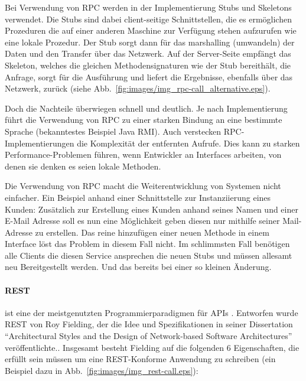 \documentclass[12pt,a4paper,bibliography=totocnumbered,listof=totocnumbered]{scrartcl}
\begin{document}
Bei Verwendung von RPC werden in der Implementierung Stubs und Skeletons verwendet. Die Stubs sind dabei client-seitige Schnittstellen, die es ermöglichen Prozeduren die auf einer anderen Maschine zur Verfügung stehen aufzurufen wie eine lokale Prozedur. Der Stub sorgt dann für das marshalling (umwandeln) der Daten und den Transfer über das Netzwerk. Auf der Server-Seite empfängt das Skeleton, welches die gleichen Methodensignaturen wie der Stub bereithält, die Anfrage, sorgt für die Ausführung und liefert die Ergebnisse, ebenfalls über das Netzwerk, zurück (siehe Abb.~\ref{fig:images/img_rpc-call_alternative.eps}).\cite{krzyzanowski}


Doch die Nachteile überwiegen schnell und deutlich. Je nach Implementierung führt die Verwendung von RPC zu einer starken Bindung an eine bestimmte Sprache (bekanntestes Beispiel Java RMI). Auch verstecken RPC-Implementierungen die Komplexität der entfernten Aufrufe. Dies kann zu starken Performance-Problemen führen, wenn Entwickler an Interfaces arbeiten, von denen sie denken es seien lokale Methoden\cite[S.93]{buildingms}.

Die Verwendung von RPC macht die Weiterentwicklung von Systemen nicht einfacher. Ein Beispiel anhand einer Schnittstelle zur Instanziierung eines Kunden: Zusätzlich zur Erstellung eines Kunden anhand seines Namen und einer E-Mail Adresse soll es nun eine Möglichkeit geben diesen nur mithilfe seiner Mail-Adresse zu erstellen. Das reine hinzufügen einer neuen Methode in einem Interface löst das Problem in diesem Fall nicht. Im schlimmsten Fall benötigen alle Clients die diesen Service ansprechen die neuen Stubs und müssen allesamt neu Bereitgestellt werden\cite[S.94]{buildingms}. Und das bereits bei einer so kleinen Änderung.

\paragraph{\acf{REST}}\label{ch:rest} ist eine der meistgenutzten Programmierparadigmen für \acp{API} \cite{duvander}. Entworfen wurde \ac{REST} von Roy Fielding, der die Idee und Spezifikationen in seiner Dissertation \enquote{Architectural Styles and the Design of Network-based Software Architectures} veröffentlichte.\cite{fielding}. Insgesamt besteht Fielding auf die folgenden 6 Eigenschaften, die erfüllt sein müssen um eine REST-Konforme Anwendung zu schreiben (ein Beispiel dazu in Abb.~\ref{fig:images/img_rest-call.eps}):
\end{document}
